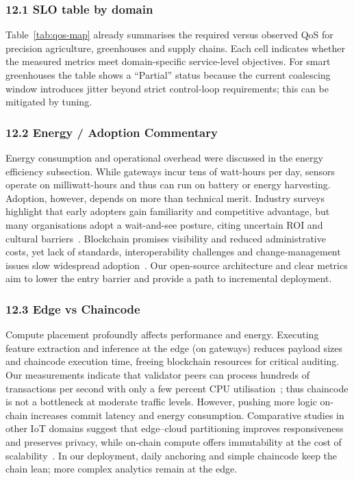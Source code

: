\documentclass[12pt,onecolumn]{IEEEtran} %
\begin{document}
\subsubsection*{12.1 SLO table by domain}
Table~\ref{tab:qos-map} already summarises the required versus observed QoS for precision agriculture, greenhouses and supply chains. Each cell indicates whether the measured metrics meet domain-specific service-level objectives. For smart greenhouses the table shows a ``Partial'' status because the current coalescing window introduces jitter beyond strict control-loop requirements; this can be mitigated by tuning.

\subsubsection*{12.2 Energy / Adoption Commentary}
Energy consumption and operational overhead were discussed in the energy efficiency subsection. While gateways incur tens of watt-hours per day, sensors operate on milliwatt-hours and thus can run on battery or energy harvesting. Adoption, however, depends on more than technical merit. Industry surveys highlight that early adopters gain familiarity and competitive advantage, but many organisations adopt a wait-and-see posture, citing uncertain ROI and cultural barriers~\cite{gsci_blockchain_supplychain_2022}. Blockchain promises visibility and reduced administrative costs, yet lack of standards, interoperability challenges and change-management issues slow widespread adoption~\cite{gsci_blockchain_supplychain_2022}. Our open-source architecture and clear metrics aim to lower the entry barrier and provide a path to incremental deployment.

\subsubsection*{12.3 Edge vs Chaincode}
Compute placement profoundly affects performance and energy. Executing feature extraction and inference at the edge (on gateways) reduces payload sizes and chaincode execution time, freeing blockchain resources for critical auditing. Our measurements indicate that validator peers can process hundreds of transactions per second with only a few percent CPU utilisation~\cite{ref76853680998234}; thus chaincode is not a bottleneck at moderate traffic levels. However, pushing more logic on-chain increases commit latency and energy consumption. Comparative studies in other IoT domains suggest that edge–cloud partitioning improves responsiveness and preserves privacy, while on-chain compute offers immutability at the cost of scalability~\cite{gsci_blockchain_supplychain_2022}. In our deployment, daily anchoring and simple chaincode keep the chain lean; more complex analytics remain at the edge.
\end{document}
